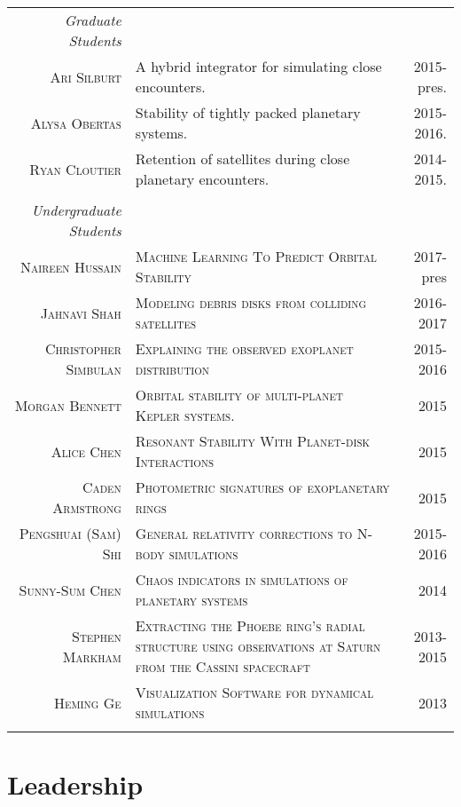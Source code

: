 \documentclass[10pt]{article} %
\begin{document}
{\begin{tabular}{r|p{9.9cm}r}
{\it Graduate Students} \\
\textsc{Ari Silburt} & A hybrid integrator for simulating close encounters. & 2015-pres. \\
\textsc{Alysa Obertas} & Stability of tightly packed planetary systems. & 2015-2016. \\
\textsc{Ryan Cloutier} & Retention of satellites during close planetary encounters. & 2014-2015. \\
\\
{\it Undergraduate Students} \\
\textsc{Naireen Hussain} & \textsc{Machine Learning To Predict Orbital Stability} & 2017-pres \\
\textsc{Jahnavi Shah} & \textsc{Modeling debris disks from colliding satellites} & 2016-2017 \\
\textsc{Christopher Simbulan} & \textsc{Explaining the observed exoplanet distribution} & 2015-2016 \\
\textsc{Morgan Bennett} & \textsc{Orbital stability of multi-planet Kepler systems.} & 2015  \\
\textsc{Alice Chen} & \textsc{Resonant Stability With Planet-disk Interactions} & 2015 \\
\textsc{Caden Armstrong} & \textsc{Photometric signatures of exoplanetary rings} & 2015 \\
\textsc{Pengshuai (Sam) Shi} & \textsc{General relativity corrections to N-body simulations} & 2015-2016 \\
\textsc{Sunny-Sum Chen} & \textsc{Chaos indicators in simulations of planetary systems} & 2014 \\
\textsc{Stephen Markham} & \textsc{Extracting the Phoebe ring's radial structure using observations at Saturn from the Cassini spacecraft} & 2013-2015 \\
\textsc{Heming Ge} & \textsc{Visualization Software for dynamical simulations} & 2013 \\
\multicolumn{3}{c}{} \\
\end{tabular}


\section{Leadership}

}
\end{document}
